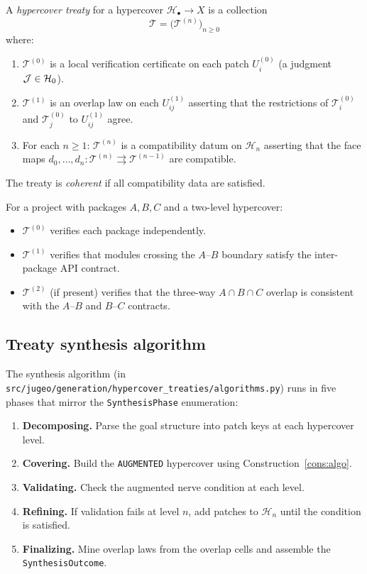 \documentclass[11pt]{article}
\newcommand{\HC}{\mathcal{H}}              %
\newcommand{\Treaty}{\mathcal{T}}          %
\newcommand{\face}[1]{d_{#1}}             %
\newcommand{\KindAug}{\texttt{AUGMENTED}}
\begin{document}
\begin{definition}\label{def:treaty}
  A \emph{hypercover treaty} for a hypercover $\HC_\bullet \to X$ is
  a collection
  \[
    \Treaty = \bigl(\Treaty^{(n)}\bigr)_{n \ge 0}
  \]
  where:
  \begin{enumerate}[label=(\alph*)]
    \item $\Treaty^{(0)}$ is a local verification certificate on each
      patch $U^{(0)}_i$ (a judgment $\J \in \HC_0$).
    \item $\Treaty^{(1)}$ is an overlap law on each $U^{(1)}_{ij}$
      asserting that the restrictions of $\Treaty^{(0)}_i$ and
      $\Treaty^{(0)}_j$ to $U^{(1)}_{ij}$ agree.
    \item For each $n \ge 1$: $\Treaty^{(n)}$ is a compatibility datum
      on $\HC_n$ asserting that the face maps
      $\face{0}, \ldots, \face{n} : \Treaty^{(n)} \rightrightarrows
      \Treaty^{(n-1)}$ are compatible.
  \end{enumerate}
  The treaty is \emph{coherent} if all compatibility data are satisfied.
\end{definition}

\begin{example}
  For a project with packages $A, B, C$ and a two-level hypercover:
  \begin{itemize}
    \item $\Treaty^{(0)}$ verifies each package independently.
    \item $\Treaty^{(1)}$ verifies that modules crossing the $A$--$B$
      boundary satisfy the inter-package API contract.
    \item $\Treaty^{(2)}$ (if present) verifies that the three-way
      $A \cap B \cap C$ overlap is consistent with the $A$--$B$ and
      $B$--$C$ contracts.
  \end{itemize}
\end{example}

\subsection{Treaty synthesis algorithm}

The synthesis algorithm (in
\texttt{src/jugeo/generation/hypercover\_treaties/algorithms.py})
runs in five phases that mirror the \texttt{SynthesisPhase} enumeration:

\begin{enumerate}
  \item \textbf{Decomposing.} Parse the goal structure into patch keys
    at each hypercover level.
  \item \textbf{Covering.} Build the \KindAug{} hypercover using
    Construction~\ref{cons:algo}.
  \item \textbf{Validating.} Check the augmented nerve condition at
    each level.
  \item \textbf{Refining.} If validation fails at level $n$, add
    patches to $\HC_n$ until the condition is satisfied.
  \item \textbf{Finalizing.} Mine overlap laws from the overlap cells
    and assemble the \texttt{SynthesisOutcome}.
\end{enumerate}
\end{document}
